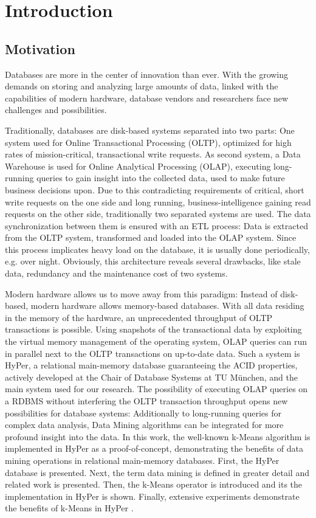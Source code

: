\chapter{Introduction}\label{chapter:introduction}

\section{Motivation}


Databases are more in the center of innovation than ever. With the growing demands on storing and analyzing large amounts of data, linked with the capabilities of modern hardware, database vendors and researchers face new challenges and possibilities. 

Traditionally, databases are disk-based systems separated into two parts: One system used for Online Transactional Processing (OLTP), optimized for high rates of mission-critical, transactional write requests. As second system, a Data Warehouse is used for Online Analytical Processing (OLAP), executing long-running queries to gain insight into the  collected data, used to make future business decisions upon. Due to this contradicting requirements of critical, short write requests on the one side and long running, business-intelligence gaining read requests on the other side, traditionally two separated systems are used. The data synchronization between them is ensured with an ETL process: Data is extracted from the OLTP system, transformed and loaded into the OLAP system. Since this process implicates heavy load on the database, it is usually done periodically, e.g. over night. Obviously, this architecture reveals several drawbacks, like stale data, redundancy and the maintenance cost of two systems.

Modern hardware allows us to move away from this paradigm: Instead of disk-based, modern hardware allows memory-based databases. With all data residing in the memory of the hardware, an unprecedented throughput of OLTP transactions is possible. Using snapshots of the transactional data by exploiting the virtual memory management of the operating system, OLAP queries can run in parallel next to the OLTP transactions on up-to-date data. Such a system is HyPer, a relational main-memory database guaranteeing the ACID properties, actively developed at the Chair of Database Systems at TU München, and the main system used for our research. 
The possibility of executing OLAP queries on a RDBMS without interfering the OLTP transaction throughput opens new possibilities for database systems: Additionally to long-running queries for complex data analysis, Data Mining algorithms can be integrated for more profound insight into the data. 
In this work, the well-known k-Means algorithm is implemented in HyPer as a proof-of-concept, demonstrating the benefits of data mining operations in relational main-memory databases. First, the HyPer database is presented. Next, the term data mining is defined in greater detail and related work is presented. Then, the k-Means operator is introduced and its the implementation in HyPer is shown. Finally, extensive experiments demonstrate the benefits of k-Means in HyPer .


